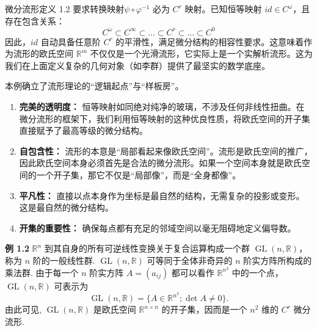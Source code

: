 \begin{myremark}[例1.1]
微分流形定义 1.2 要求转换映射$\psi \circ \varphi^{-1}$ 必为 $C^r$ 映射。已知恒等映射 $id \in C^\omega$，且存在包含关系：
$$ C^\omega \subset C^\infty \subset \dots \subset C^r \subset \dots \subset C^0 \text{} $$
因此，$id$ 自动具备任意阶 $C^r$ 的平滑性，满足微分结构的相容性要求。这意味着作为流形的欧氏空间 $\mathbb{R}^m$ 不仅仅是一个光滑流形，它实际上是一个实解析流形。这为我们在上面定义复杂的几何对象（如李群）提供了最坚实的数学底座。

本例确立了流形理论的“逻辑起点”与“样板房”。
\begin{enumerate}
      \item \textbf{完美的透明度：} 恒等映射如同绝对纯净的玻璃，不涉及任何非线性扭曲。在微分流形的框架下，我们利用恒等映射的这种优良性质，将欧氏空间的开子集直接赋予了最高等级的微分结构。
       \item \textbf{自包含性：} 流形的本意是“局部看起来像欧氏空间”。流形是欧氏空间的推广，因此欧氏空间本身必须首先是合法的微分流形。如果一个空间本身就是欧氏空间的一个开子集，那它不仅是“局部像”，而是“全身都像”。
    \item \textbf{平凡性：} 直接以点本身作为坐标是最自然的结构，无需复杂的投影或变形。这是最自然的微分结构。
    \item \textbf{开集的重要性：} 确保每点都有充足的邻域空间以毫无阻碍地定义偏导数。
\end{enumerate}

\end{myremark}

{\bf 例 1.2}  $\mathbb{R}^n$  到其自身的所有可逆线性变换关于复合运算构成一个群  $\operatorname {GL}(n,\mathbb{R})$，称为  $n$  阶的一般线性群.  $\operatorname {GL}(n,\mathbb{R})$  可等同于全体非奇异的  $n$  阶实方阵所构成的乘法群. 由于每一个  $n$  阶实方阵  $A = (a_{ij})$  都可以看作  $\mathbb{R}^{n^2}$  中的一个点， $\operatorname {GL}(n,\mathbb{R})$  可表示为
$$
\operatorname {G L} (n, \mathbb {R}) = \{A \in \mathbb {R} ^ {n^2}; \det  A \neq 0 \}.
$$
由此可见,  $\operatorname{GL}(n, \mathbb{R})$  是欧氏空间  $\mathbb{R}^{n\times n}$  的开子集，因而是一个  $n^2$  维的  $C^r$  微分流形.

